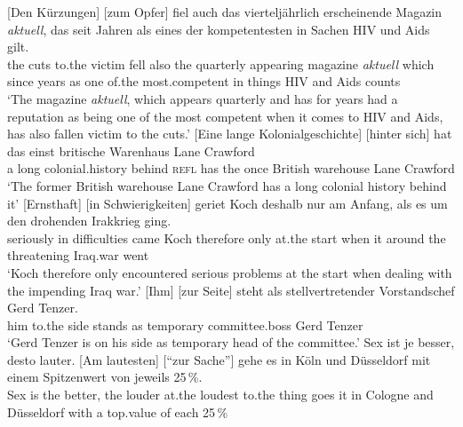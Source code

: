\eal%
\label{pvp-fvg-idioms}%
\ex 
\gll {}[Den Kürzungen] [zum Opfer] fiel auch das vierteljährlich erscheinende Magazin \emph{aktuell}, das seit Jahren als eines der kompetentesten in Sachen HIV und Aids gilt.\footnotemark\\
	  \spacebr{}the cuts \spacebr{}to.the victim fell also the quarterly appearing magazine \emph{aktuell} which since years as one of.the most.competent in things HIV and Aids counts \\
\glt `The magazine \emph{aktuell}, which appears quarterly and has for years had a reputation as being one of the most competent when it comes to HIV and Aids, has also fallen victim to the cuts.'
\ex 
\gll  {}[Eine lange Kolonialgeschichte] [hinter sich] hat das einst britische Warenhaus Lane Crawford\footnotemark\\
	   \spacebr{}a long colonial.history \spacebr{}behind \textsc{refl} has the once British warehouse Lane Crawford \\
\glt `The former British warehouse Lane Crawford has a long colonial history behind it'
\ex %
\gll {}[Ernsthaft] [in Schwierigkeiten] geriet Koch deshalb nur am Anfang, als es um den drohenden Irakkrieg ging.\footnotemark\\
	  \spacebr{}seriously  \spacebr{}in difficulties came Koch therefore only at.the start when it around the threatening Iraq.war went\\
\glt `Koch therefore only encountered serious problems at the start when dealing with the impending Iraq war.'
\ex 
\gll {}[Ihm] [zur Seite] steht als stellvertretender Vorstandschef Gerd Tenzer.\footnotemark\\
	 \spacebr{}him \spacebr{}to.the side stands as temporary committee.boss Gerd Tenzer\\
\glt `Gerd Tenzer is on his side as temporary head of the committee.'
\ex 
\gll Sex ist je besser, desto lauter. [Am lautesten] ["`zur Sache"'] gehe es in Köln und Düsseldorf mit einem Spitzenwert von jeweils 25\,\%.\footnotemark\\
	 Sex is the better, the louder \spacebr{}at.the loudest \hspaceThis{["`}to.the thing goes it in Cologne and Düsseldorf with a top.value of each 25\,\%\\
